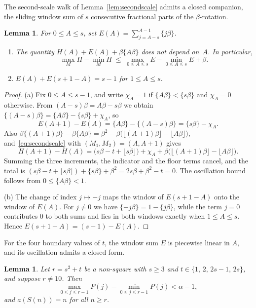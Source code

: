 \documentclass{birkjour}
\newtheorem{lemma}[theorem]{Lemma}
\theoremstyle{definition}
\theoremstyle{remark}
\newcommand{\fl}[1]{\lfloor #1 \rfloor}
\newcommand{\frc}[1]{\{ #1 \}}
\begin{document}
The second-scale walk of Lemma~\ref{lem:secondscale} admits a
closed companion, the sliding window sum of $s$ consecutive
fractional parts of the $\beta$-rotation.

\begin{lemma}\label{lem:window}
For $0\le A\le s$, set
$E(A)=\sum_{j=A-s}^{A-1}\frc{j\beta}$.
\begin{enumerate}
\item[\textup{(a)}] The quantity
$H(A)+E(A)+\beta\frc{A\beta}$ does not depend on~$A$. In
particular,
\[
  \max_{M}H-\min_{M}H
  \;\le\;
  \max_{0\le A\le s}E-\min_{0\le A\le s}E+\beta.
\]
\item[\textup{(b)}] $E(A)+E(s{+}1{-}A)=s-1$ for
$1\le A\le s$.
\end{enumerate}
\end{lemma}

\begin{proof}
(a) Fix $0\le A\le s-1$, and write $\chi_{A}=1$ if
$\frc{A\beta}<\frc{s\beta}$ and $\chi_{A}=0$ otherwise.
From $(A-s)\beta=A\beta-s\beta$ we obtain
$\frc{(A-s)\beta}=\frc{A\beta}-\frc{s\beta}+\chi_{A}$, so
\[
  E(A{+}1)-E(A)
  =\frc{A\beta}-\frc{(A{-}s)\beta}
  =\frc{s\beta}-\chi_{A}.
\]
Also
$\beta\frc{(A{+}1)\beta}-\beta\frc{A\beta}
=\beta^{2}-\beta\bigl(\fl{(A{+}1)\beta}-\fl{A\beta}\bigr)$,
and~\eqref{eq:secondscale} with $(M_{1},M_{2})=(A,A{+}1)$ gives
\[
  H(A{+}1)-H(A)
  =\bigl(s\beta-t+\fl{s\beta}\bigr)+\chi_{A}
  +\beta\bigl(\fl{(A{+}1)\beta}-\fl{A\beta}\bigr).
\]
Summing the three increments, the indicator and the floor
terms cancel, and the total is
$(s\beta-t+\fl{s\beta})+\frc{s\beta}+\beta^{2}
=2s\beta+\beta^{2}-t=0$. The oscillation bound follows from
$0\le\frc{A\beta}<1$.

(b) The change of index $j\mapsto-j$ maps the window of
$E(s{+}1{-}A)$ onto the window of $E(A)$. For $j\neq 0$ we
have $\frc{-j\beta}=1-\frc{j\beta}$, while the term $j=0$
contributes $0$ to both sums and lies in both windows
exactly when $1\le A\le s$. Hence
$E(s{+}1{-}A)=(s-1)-E(A)$.
\end{proof}

For the four boundary values of $t$, the window sum $E$ is
piecewise linear in $A$, and its oscillation admits a closed
form.

\begin{lemma}\label{lem:boundary}
Let $r=s^{2}+t$ be a non-square with $s\ge 3$ and
$t\in\{1,\,2,\,2s{-}1,\,2s\}$, and suppose $r\neq 10$. Then
\[
  \max_{0\le j\le r-1}P(j)-\min_{0\le j\le r-1}P(j)
  <\alpha-1,
\]
and $a(S(n))=n$ for all $n\ge r$.
\end{lemma}
\end{document}

